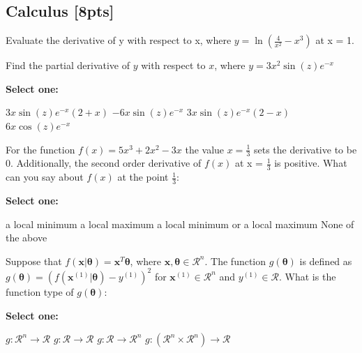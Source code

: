 \documentclass[11pt,addpoints,answers]{exam}
\numberwithin{equation}{section} %
\numberwithin{figure}{section} %
\numberwithin{table}{section} %
\newcommand{\xv}{\mathbf{x}}
\newcommand{\thetav     }{\boldsymbol \theta     }
\begin{document}
\subsection{Calculus [8pts]}
\begin{questions}



    \question[2] Evaluate the derivative of y with respect to x, where $y = \ln(\frac{4}{x^2}-x^3)$ at x = 1.

    \begin{tcolorbox}[fit,height=1cm, width=2cm, blank, borderline={1pt}{-2pt},nobeforeafter]
    \end{tcolorbox}


    \question[2] Find the partial derivative of $y$ with respect to $x$, where $y= 3x^2 \sin(z) e^{-x}$

    \textbf{Select one:}
    \begin{checkboxes}{}
        \choice $3x\sin(z) e^{-x}(2+x)$
        \choice $-6x\sin(z) e^{-x}$
        \choice $3x\sin(z) e^{-x}(2-x)$
        \choice $6x\cos(z)e^{-x}$
    \end{checkboxes}


    \question[2] For the function $f(x)= 5x^3 +2x^2-3x$ the value $x=\frac{1}{3}$ sets the derivative to be 0. Additionally, the second order derivative of $f(x)$ at x = $\frac{1}{3}$ is positive. What can you say about $f(x)$ at the point $\frac{1}{3}$:

    \textbf{Select one:}
    \begin{checkboxes}{}
        \choice a local minimum
        \choice a local maximum
        \choice a local minimum or a local maximum
        \choice None of the above
    \end{checkboxes}

    
    \question[2] Suppose that $f(\xv|\thetav)=\xv^T\thetav$, where $\xv, \thetav \in \mathcal{R}^n$. The function $g(\thetav)$ is defined as $g(\thetav) = (f(\xv^{(1)}|\thetav) - y^{(1)})^2$ for $\xv^{(1)} \in \mathcal{R}^n$ and $y^{(1)} \in \mathcal{R}$. What is the function type of $g(\thetav)$:

    \textbf{Select one:}
    \begin{checkboxes}{}
        \choice $g: \mathcal{R}^n \rightarrow \mathcal{R}$
        \choice $g: \mathcal{R} \rightarrow \mathcal{R}$
        \choice $g: \mathcal{R} \rightarrow \mathcal{R}^n$
        \choice $g: (\mathcal{R}^n \times \mathcal{R}^n) \rightarrow \mathcal{R}$
    \end{checkboxes}

    
    \clearpage
\end{questions}
\end{document}
